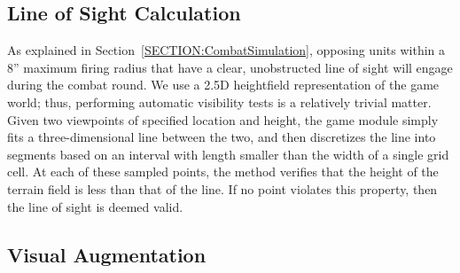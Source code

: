 \documentclass[review]{vgtc}                 %
\begin{document}
\subsection{Line of Sight Calculation }

As explained in Section~\ref{SECTION:CombatSimulation}, opposing units
within a 8'' maximum firing radius that have a clear, unobstructed
line of sight will engage during the combat round.
%
We use a 2.5D heightfield representation of the game world; thus,
performing automatic visibility tests is a relatively trivial matter.
Given two viewpoints of specified location and height, the game module
simply fits a three-dimensional line between the two, and then
discretizes the line into segments based on an interval with length
smaller than the width of a single grid cell.  At each of these
sampled points, the method verifies that the height of the terrain
field is less than that of the line.  If no point violates this
property, then the line of sight is deemed valid.


\subsection{Visual Augmentation }


\end{document}
